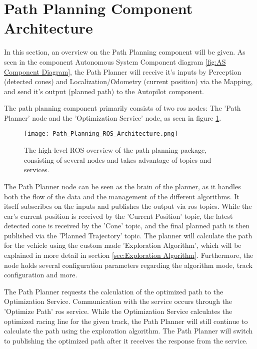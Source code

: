 \section{Path Planning Component Architecture} \label{sec:Path Planning Component Architecture}
In this section, an overview on the Path Planning component will be given. As seen in the component Autonomous System Component diagram \ref{fig:AS Component Diagram}, the Path Planner will receive it's inputs by Perception (detected cones) and Localization/Odometry (current position) via the Mapping, and send it's output (planned path) to the Autopilot component.

The path planning component primarily consists of two \acrshort{ros} nodes: The 'Path Planner' node and the 'Optimization Service' node, as seen in figure \ref{fig:Path Planning ROS Architecture}.
\begin{figure}[H]
    \centering
    \texttt{[image: Path\_Planning\_ROS\_Architecture.png]}
    \caption{The high-level ROS overview of the path planning package, consisting of several nodes and takes advantage of topics and services.}
    \label{fig:Path Planning ROS Architecture}
\end{figure}

The Path Planner node can be seen as the brain of the planner, as it handles both the flow of the data and the management of the different algorithms. It itself subscribes on the inputs and publishes the output via \acrshort{ros} topics. While the car's current position is received by the 'Current Position' topic, the latest detected cone is received by the 'Cone' topic, and the final planned path is then published via the 'Planned Trajectory' topic. The planner will calculate the path for the vehicle using the custom made 'Exploration Algorithm', which will be explained in more detail in section \ref{sec:Exploration Algorithm}. Furthermore, the node holds several configuration parameters regarding the algorithm mode, track configuration and more.

The Path Planner requests the calculation of the optimized path to the Optimization Service. Communication with the service occurs through the 'Optimize Path' \acrshort{ros} service. While the Optimization Service calculates the optimized racing line for the given track, the Path Planner will still continue to calculate the path using the exploration algorithm. The Path Planner will switch to publishing the optimized path after it receives the response from the service.


